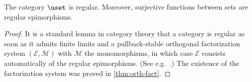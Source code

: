 %
\begin{thm}\label{thm:set_regular}\label{lem:images_are_coequalizers}
The category $\uset$ is regular. Moreover, surjective functions between sets are regular epimorphisms.
\end{thm}

\begin{proof}
It is a standard lemma in category theory that a category is regular as soon as it admits finite limits and a pullback-stable orthogonal
factorization system $(\mathcal{E},\mathcal{M})$ with $\mathcal{M}$ the monomorphisms, in which case $\mathcal{E}$ consists automatically of
the regular epimorphisms.
(See e.g.~\cite[A1.3.4]{elephant}.)
The existence of the factorization system was proved in \cref{thm:orth-fact}.
\end{proof}
